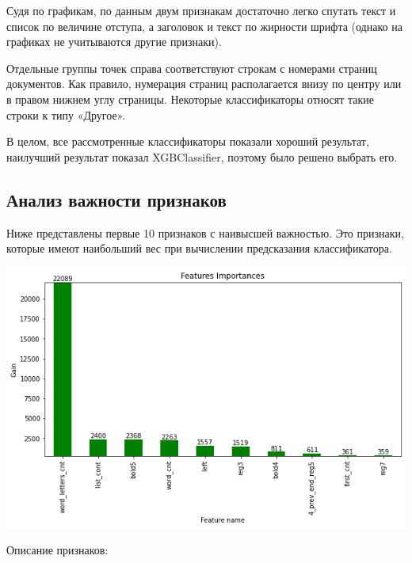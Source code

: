 \documentclass[a4paper,12pt]{article}
\begin{document}
Судя по графикам, по данным двум признакам достаточно легко спутать текст и список по величине отступа, а заголовок и текст по жирности шрифта (однако на графиках не учитываются другие признаки).

Отдельные группы точек справа соответствуют строкам с номерами страниц документов. Как правило, нумерация страниц располагается внизу по центру или в правом нижнем углу страницы. Некоторые классификаторы относят такие строки к типу «Другое».

В целом, все рассмотренные классификаторы показали хороший результат, наилучший результат показал XGBClassifier, поэтому было решено выбрать его.

\subsection{Анализ важности признаков}

Ниже представлены первые 10 признаков с наивысшей важностью. Это признаки, которые имеют наибольший вес при вычислении предсказания классификатора.

\begin{center}
	\includegraphics[width=1.0\textwidth]{pics/gaines.png}
\end{center}

Описание признаков:
\end{document}
